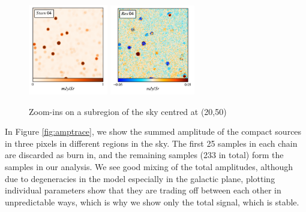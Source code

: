 \documentclass{aa}
\begin{document}
\begin{figure}
  \includegraphics[width=0.31\textwidth]{figs/zoom/starmap_04.pdf}
  \includegraphics[width=0.33\textwidth]{figs/zoom/resmap_04.pdf}\\

  \caption{Zoom-ins on a subregion of the sky centred at (20,50) }
  \label{fig:zooms}
\end{figure}


In Figure \ref{fig:amptrace}, we show the summed amplitude of the compact sources in three pixels in different regions in the sky. The first 25 samples in each chain are discarded as burn in, and the remaining samples (233 in total) form the samples in our analysis. We see good mixing of the total amplitudes, although due to degeneracies in the model especially in the galactic plane, plotting individual parameters show that they are trading off between each other in unpredictable ways, which is why we show only the total signal, which is stable.
\end{document}
